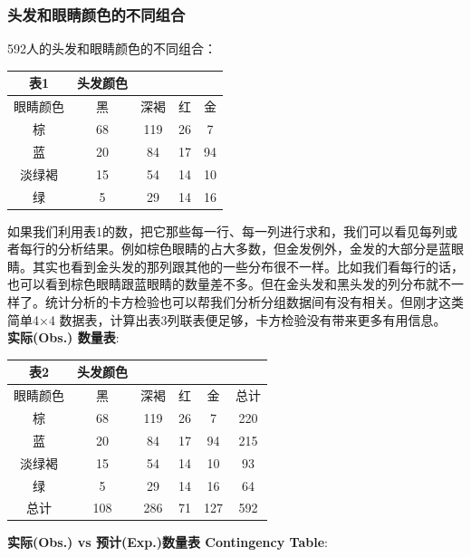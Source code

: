 \hypertarget{ux5934ux53d1ux548cux773cux775bux989cux8272ux7684ux4e0dux540cux7ec4ux5408}{%
\subsubsection{头发和眼睛颜色的不同组合}\label{ux5934ux53d1ux548cux773cux775bux989cux8272ux7684ux4e0dux540cux7ec4ux5408}}

592人的头发和眼睛颜色的不同组合：


\begin{tabular}{|c|c|c|c|c|}
\hline
表1&\multirow{4}{*}{头发颜色 }\\
\hline
眼睛颜色&黑&深褐&红&金\\
\hline
棕&68&119&26&7\\
\hline
蓝&20&84&17&94\\
\hline
淡绿褐&15&54&14&10\\
\hline
绿&5&29&14&16\\
\hline
\end{tabular}

如果我们利用表1的数，把它那些每一行、每一列进行求和，我们可以看见每列或者每行的分析结果。例如棕色眼睛的占大多数，但金发例外，金发的大部分是蓝眼睛。其实也看到金头发的那列跟其他的一些分布很不一样。比如我们看每行的话，也可以看到棕色眼睛跟蓝眼睛的数量差不多。但在金头发和黑头发的列分布就不一样了。统计分析的卡方检验也可以帮我们分析分组数据间有没有相关。但刚才这类简单4×4 数据表，计算出表3列联表便足够，卡方检验没有带来更多有用信息。\\
\textbf{实际(Obs.) 数量表}:


\begin{tabular}{|c|c|c|c|c|c|}
\hline
表2&\multirow{5}{*}{头发颜色 }\\
\hline
眼睛颜色&黑&深褐&红&金&总计\\
\hline
棕&68&119&26&7&220\\
\hline
蓝&20&84&17&94&215\\
\hline
淡绿褐&15&54&14&10&93\\
\hline
绿&5&29&14&16&64\\
\hline
总计&108&286&71&127&592\\
\hline
\end{tabular}


\textbf{实际(Obs.) vs 预计(Exp.)数量表 Contingency Table}:

